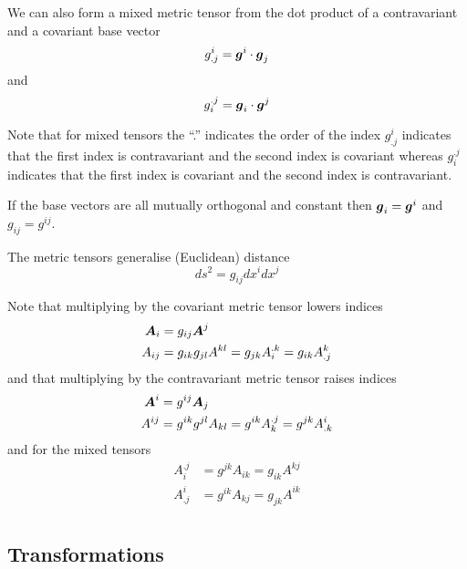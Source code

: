 We can also form a mixed metric tensor from the dot product of a contravariant
and a covariant base vector \ie
\begin{equation}
  g^{i}_{.j}=\boldsymbol{g}^{i}\cdot\boldsymbol{g}_{j}
\end{equation}
and 
\begin{equation}
  g_{i}^{.j}=\boldsymbol{g}_{i}\cdot\boldsymbol{g}^{j}
\end{equation}

Note that for mixed tensors the ``.'' indicates the order of the index \ie
$g^{i}_{.j}$ indicates that the first index is contravariant and the second
index is covariant whereas $g_{i}^{.j}$ indicates that the first index is
covariant and the second index is contravariant.

If the base vectors are all mutually orthogonal and constant then
$\boldsymbol{g}_{i}=\boldsymbol{g}^{i}$ and $g_{ij}=g^{ij}$.

The metric tensors generalise (Euclidean) distance \ie
\begin{equation}
  ds^{2}=g_{ij}dx^{i}dx^{j}
\end{equation}

Note that multiplying by the covariant metric tensor lowers indices \ie
\begin{equation}
  \begin{split}
    \boldsymbol{A}_{i} &= g_{ij}\boldsymbol{A}^{j} \\
    A_{ij} &= g_{ik}g_{jl}A^{kl} = g_{jk}A_{i}^{.k} = g_{ik}A^{k}_{.j} 
  \end{split}
\end{equation}
and that multiplying by the contravariant metric tensor raises indices \ie
\begin{equation}
  \begin{split}
  \boldsymbol{A}^{i} &=  g^{ij}\boldsymbol{A}_{j} \\
   A^{ij} &= g^{ik}g^{jl}A_{kl} = g^{ik}A_{k}^{.j} = g^{jk}A^{i}_{.k}
  \end{split}
\end{equation}
and for the mixed tensors
\begin{equation}
  \begin{split}
  A_{i}^{.j} &= g^{jk}A_{ik} = g_{ik}A^{kj} \\
  A^{i}_{.j} &= g^{ik}A_{kj} = g_{jk}A^{ik} \\
  \end{split}
\end{equation}

\subsection{Transformations}

